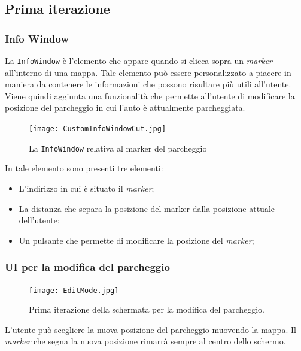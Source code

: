 \hypertarget{prima-iterazione}{%
\subsection{Prima iterazione}\label{prima-iterazione}}

\hypertarget{info-window}{%
\subsubsection{Info Window}\label{info-window}}

La \texttt{InfoWindow} è l'elemento che appare quando si clicca sopra un
\emph{marker} all'interno di una mappa. Tale elemento può essere personalizzato a piacere in maniera da contenere le informazioni che possono risultare più utili all'utente. Viene quindi aggiunta una funzionalità che permette all'utente di modificare la posizione del parcheggio in cui l'auto è attualmente parcheggiata. 

\begin{figure}[H]
\centering
\texttt{[image: CustomInfoWindowCut.jpg]}
\caption{La \texttt{InfoWindow} relativa al marker del parcheggio}
\label{info-window}
\end{figure}

In tale elemento sono presenti tre elementi:

\begin{itemize}
    \item L'indirizzo in cui è situato il \emph{marker};
    \item La distanza che separa la posizione del marker dalla posizione attuale dell'utente;
    \item Un pulsante che permette di modificare la posizione del \emph{marker};
\end{itemize}
\hypertarget{ui-per-la-modifica-del-parcheggio}{%
\subsubsection{UI per la modifica del parcheggio}\label{ui-per-la-modifica-del-parcheggio}}

\begin{figure}[H]
\centering
\texttt{[image: EditMode.jpg]}
\caption{Prima iterazione della schermata per la modifica del parcheggio.}
\end{figure}

L'utente può scegliere la nuova posizione del parcheggio muovendo la mappa. Il \emph{marker} che segna la nuova posizione rimarrà sempre al centro dello schermo.

